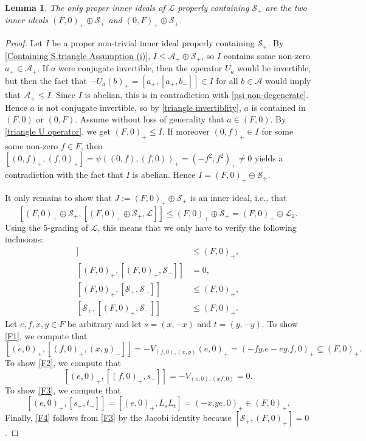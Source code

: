 \documentclass[oneside,a4paper]{amsart} %
\newtheorem{lemma}[theorem]{Lemma}
\theoremstyle{definition}
\newcommand{\A}{\mathcal{A}}
\renewcommand{\SS}{\mathcal{S}}
\newcommand{\LL}{\mathcal{L}}
\numberwithin{equation}{section}
\begin{document}
\begin{lemma}
\label{triangle containing S}
	The only proper inner ideals of $\LL$ properly containing $\SS_+$ are the two inner ideals $(F,0)_+ \oplus \SS_+$ and $(0,F)_+ \oplus \SS_+$.
\end{lemma}
\begin{proof}
	Let $I$ be a proper non-trivial inner ideal properly containing $\SS_+$.
	By \cref{Containing S,triangle Assumption (i)}, $I\leq \A_+ \oplus \SS_+$, so $I$ contains some non-zero $a_+\in\A_+$.
	If $a$ were conjugate invertible, then the operator $U_a$ would be invertible, but then the fact that $-U_{a}(b)_+=[a_+,[a_+,b_-]]\in I$ for all $b\in \A$ would imply that $\A_+\leq I$.
	Since $I$ is abelian, this is in contradiction with \cref{psi non-degenerate}.
	Hence $a$ is not conjugate invertible, so by \cref{triangle invertiblity}, $a$ is contained in $(F,0)$ or $(0,F)$.
	Assume without loss of generality that $a \in (F,0)$.
	By \cref{triangle U operator}, we get $(F,0)_+ \leq I$.
	If moreover $(0,f)_+\in I$ for some some non-zero $f\in F$, then $[(0,f)_+,(f,0)_+]=\psi ((0,f),(f,0))_+=(-f^2,f^2)_+\neq 0$ yields a contradiction with the fact that $I$ is abelian.
	Hence $I=(F,0)_+\oplus \SS_+$.
	
	It only remains to show that $J:=(F,0)_+\oplus \SS_+$ is an inner ideal, i.e., that
	\[ [(F,0)_+ \oplus \SS_+, [(F,0)_+ \oplus \SS_+, \LL]] \leq (F,0)_+ \oplus \SS_+ = (F,0)_+ \oplus \LL_2 . \]
	Using the $5$-grading of $\LL$, this means that we only have to verify the following inclusions:
	\begin{align}
	   [(F,0)_+, [(F,0)_+, \A_-]] &\leq (F,0)_+, \label{F1} \\
	   [(F,0)_+, [(F,0)_+, \SS_-]] &= 0, \label{F2} \\
	   [(F,0)_+, [\SS_+, \SS_-]] &\leq (F,0)_+, \label{F3} \\
	   [\SS_+, [(F,0)_+, \SS_-]] &\leq (F,0)_+. \label{F4}
	\end{align}
	Let $e,f,x,y \in F$ be arbitrary and let $s = (x, -x)$ and $t = (y, -y)$.
	To show \cref{F1}, we compute that
	\[ [(e,0)_+ , [(f,0)_+ , (x,y)_-]] = -V_{(f,0), (x,y)}(e,0)_+ = (-fy.e - ey.f, 0)_+ \subseteq (F,0)_+ . \]
	To show \cref{F2}, we compute that
	\[ [(e,0)_+ , [(f,0)_+ , s_-]] = -V_{(e,0),(xf,0)} = 0 . \]
	To show \cref{F3}, we compute that
	\[ [(e,0)_+ , [s_+ , t_-]] = [(e,0)_+ , L_s L_t] = (-x.ye, 0)_+ \in (F,0)_+ . \]
	Finally, \cref{F4} follows from \cref{F3} by the Jacobi identity because $[\SS_+, (F,0)_+] = 0$.
\end{proof}
\end{document}
